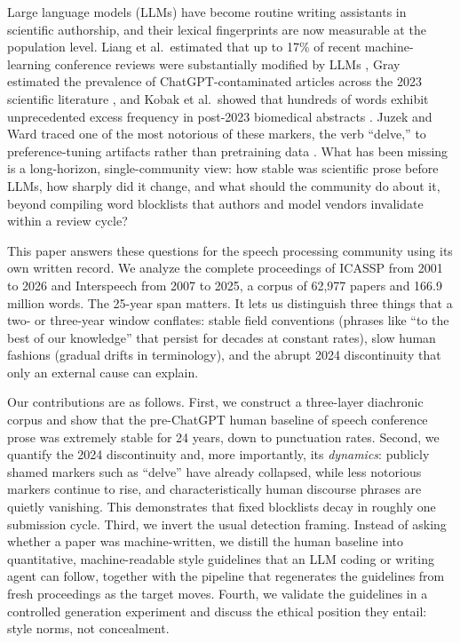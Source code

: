 \documentclass[a4paper,10pt,twocolumn]{article}
\begin{document}
Large language models (LLMs) have become routine writing assistants in scientific authorship, and their lexical fingerprints are now measurable at the population level. Liang et al.\ estimated that up to 17\% of recent machine-learning conference reviews were substantially modified by LLMs \cite{liang2024}, Gray estimated the prevalence of ChatGPT-contaminated articles across the 2023 scientific literature \cite{gray2024}, and Kobak et al.\ showed that hundreds of words exhibit unprecedented excess frequency in post-2023 biomedical abstracts \cite{kobak2024}. Juzek and Ward traced one of the most notorious of these markers, the verb ``delve,'' to preference-tuning artifacts rather than pretraining data \cite{juzek2025}. What has been missing is a long-horizon, single-community view: how stable was scientific prose before LLMs, how sharply did it change, and what should the community do about it, beyond compiling word blocklists that authors and model vendors invalidate within a review cycle?

This paper answers these questions for the speech processing community using its own written record. We analyze the complete proceedings of ICASSP from 2001 to 2026 and Interspeech from 2007 to 2025, a corpus of 62,977 papers and 166.9 million words. The 25-year span matters. It lets us distinguish three things that a two- or three-year window conflates: stable field conventions (phrases like ``to the best of our knowledge'' that persist for decades at constant rates), slow human fashions (gradual drifts in terminology), and the abrupt 2024 discontinuity that only an external cause can explain.

Our contributions are as follows. First, we construct a three-layer diachronic corpus and show that the pre-ChatGPT human baseline of speech conference prose was extremely stable for 24 years, down to punctuation rates. Second, we quantify the 2024 discontinuity and, more importantly, its \emph{dynamics}: publicly shamed markers such as ``delve'' have already collapsed, while less notorious markers continue to rise, and characteristically human discourse phrases are quietly vanishing. This demonstrates that fixed blocklists decay in roughly one submission cycle. Third, we invert the usual detection framing. Instead of asking whether a paper was machine-written, we distill the human baseline into quantitative, machine-readable style guidelines that an LLM coding or writing agent can follow, together with the pipeline that regenerates the guidelines from fresh proceedings as the target moves. Fourth, we validate the guidelines in a controlled generation experiment and discuss the ethical position they entail: style norms, not concealment.
\end{document}
